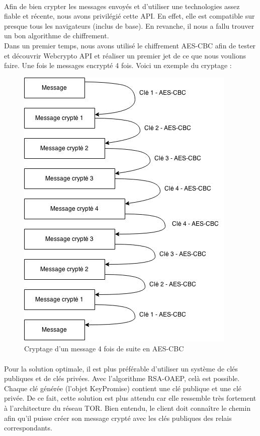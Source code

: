\documentclass[a4paper,12pt]{report}
\begin{document}
	\paragraph*{}
	Afin de bien crypter les messages envoyés et d'utiliser une technologies assez fiable et récente, nous avons privilégié cette API. En effet, elle est compatible sur presque tous les navigateurs (inclus de base). En revanche, il nous a fallu trouver un bon algorithme de chiffrement.\\
	Dans un premier temps, nous avons utilisé le chiffrement AES-CBC afin de tester et découvrir Webcrypto API et réaliser un premier jet de ce que nous voulions faire. Une fois le messages encrypté 4 fois. Voici un exemple du cryptage :
	\newpage	
	\begin{figure}[h] %
		\includegraphics[scale=0.70]{AES.jpg}
		\caption{Cryptage d'un message 4 fois de suite en AES-CBC}
		\label{AES}
	\end{figure}
	\paragraph*{}
	Pour la solution optimale, il est plus préférable d'utiliser un système de clés publiques et de clés privées. Avec l'algorithme RSA-OAEP, celà est possible. Chaque clé générée (l'objet KeyPromise) contient une clé publique et une clé privée. De ce fait, cette solution est plus attendu car elle ressemble très fortement à l'architecture du réseau TOR. Bien entendu, le client doit connaître le chemin afin qu'il puisse créer son message crypté avec les clés publiques des relais correspondants.
\end{document}
